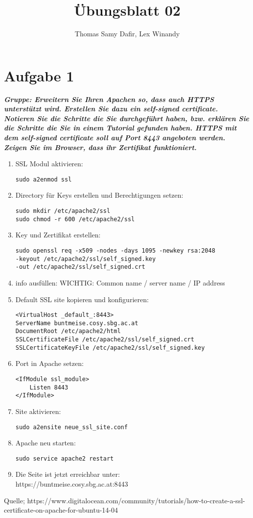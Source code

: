 \documentclass[12pt, a4paper]{report}
\title{Übungsblatt 02}
\author{Thomas Samy Dafir, Lex Winandy}
\date{}
\begin{document}
\maketitle

\section*{Aufgabe 1}
\textbf{\textit{Gruppe: Erweitern Sie Ihren Apachen so, dass auch HTTPS unterstützt wird. Erstellen
Sie dazu ein self-signed certificate. Notieren Sie die Schritte die Sie durchgeführt haben,
bzw. erklären Sie die Schritte die Sie in einem Tutorial gefunden haben. HTTPS mit dem self-signed certificate soll auf Port 
8443 angeboten werden. Zeigen Sie im Browser, dass ihr Zertifikat funktioniert.}}\\
\begin{enumerate}
	\item SSL Modul aktivieren:
	\begin{verbatim}
sudo a2enmod ssl
	\end{verbatim}
	\item Directory für Keys erstellen und Berechtigungen setzen:
	\begin{verbatim}
sudo mkdir /etc/apache2/ssl
sudo chmod -r 600 /etc/apache2/ssl
	\end{verbatim}
	\item Key und Zertifikat erstellen:
	\begin{verbatim}
sudo openssl req -x509 -nodes -days 1095 -newkey rsa:2048 
-keyout /etc/apache2/ssl/self_signed.key 
-out /etc/apache2/ssl/self_signed.crt
	\end{verbatim}
	\item info ausfüllen: WICHTIG: Common name / server name / IP address
	\item Default SSL site kopieren und konfigurieren:
	\begin{verbatim}
<VirtualHost _default_:8443>	
ServerName buntmeise.cosy.sbg.ac.at
DocumentRoot /etc/apache2/html
SSLCertificateFile /etc/apache2/ssl/self_signed.crt
SSLCertificateKeyFile /etc/apache2/ssl/self_signed.key
	\end{verbatim}
\item Port in Apache setzen:
	\begin{verbatim}
<IfModule ssl_module>
	Listen 8443
</IfModule>
	\end{verbatim}
\item Site aktivieren:
	\begin{verbatim}
sudo a2ensite neue_ssl_site.conf
	\end{verbatim}	
	\item Apache neu starten:
	\begin{verbatim}
sudo service apache2 restart
	\end{verbatim}
\item Die Seite ist jetzt erreichbar unter:\\
https://buntmeise.cosy.sbg.ac.at:8443
\end{enumerate}
Quelle; https://www.digitalocean.com/community/tutorials/how-to-create-a-ssl-certificate-on-apache-for-ubuntu-14-04
\end{document}
